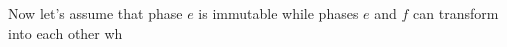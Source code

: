 Now let's assume that phase \(e\) is immutable while phases \(e\) and \(f\) can transform into each other wh